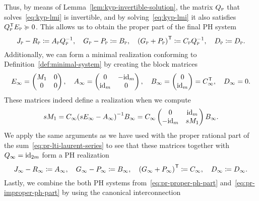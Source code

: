 Thus, by means of Lemma~\ref{lem:kyp-invertible-solution}, the matrix $Q_\msc{p}$ that solves~\eqref{eq:kyp-lmi} is invertible, and by solving~\eqref{eq:kyp-lmi} it also satisfies $Q_\msc{p}\trans E_\msc{p} \succcurlyeq 0$.
This allows us to obtain the proper part of the final \ac{PH} system
\begin{equation}\label{eq:pr-proper-ph-part}
    J_\msc{p} - R_\msc{p} \coloneqq A_\msc{p} Q_\msc{p}\inv,\quad G_\msc{p} - P_\msc{p} \coloneqq B_\msc{p},\quad {(G_\msc{p} + P_\msc{p})}\trans \coloneqq C_\msc{p} Q_\msc{p}\inv,\quad D_\msc{p} \coloneqq D_\msc{p}.
\end{equation}
Additionally, we can form a minimal realization conforming to Definition~\ref{def:minimal-system} by creating the block matrices
\begin{equation*}
    E_\infty = \begin{pmatrix}
        M_1 & 0 \\
        0 & 0
    \end{pmatrix},\quad A_\infty = \begin{pmatrix}
        0 & -\id[m] \\
        \id[m] & 0
    \end{pmatrix},\quad B_\infty = \begin{pmatrix}
        0 \\
        \id[m]
    \end{pmatrix} = C_\infty\trans,\quad D_\infty = 0.
\end{equation*}
These matrices indeed define a realization when we compute
\begin{equation*}
    s M_1 = C_\infty {(s E_\infty - A_\infty)}\inv B_\infty = C_\infty \begin{pmatrix}
        0 & \id[m] \\
        -\id[m] & s M_1
    \end{pmatrix} B_\infty.
\end{equation*}
We apply the same arguments as we have used with the proper rational part of the sum~\eqref{eq:pr-lti-laurent-series} to see that these matrices together with $Q_\infty = \id[2m]$ form a \ac{PH} realization
\begin{equation}\label{eq:pr-improper-ph-part}
    J_\infty - R_\infty \coloneqq A_\infty,\quad G_\infty - P_\infty \coloneqq B_\infty,\quad {(G_\infty + P_\infty)}\trans \coloneqq C_\infty,\quad D_\infty \coloneqq D_\infty.
\end{equation}
Lastly, we combine the both \ac{PH} systems from~\eqref{eq:pr-proper-ph-part} and~\eqref{eq:pr-improper-ph-part} by using the canonical interconnection
